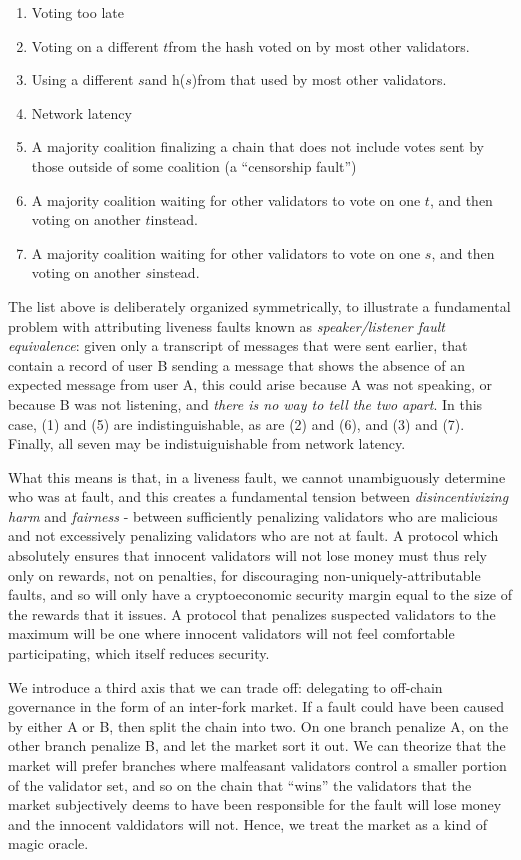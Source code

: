 \documentclass[12pt, final]{article}
\newcommand{\source}{\ensuremath{s}\space}
\newcommand{\target}{\ensuremath{t}\space}
\newcommand{\sourceheight}{\textnormal{h(\ensuremath{s})}\space} %
\begin{document}
\begin{enumerate}
\item Voting too late
\item Voting on a different \target from the hash voted on by most other validators.
\item Using a different \source and \sourceheight from that used by most other validators.
\item Network latency
\item A majority coalition finalizing a chain that does not include votes sent by those outside of some coalition (a ``censorship fault'')
\item A majority coalition waiting for other validators to vote on one \target, and then voting on another \target instead.
\item A majority coalition waiting for other validators to vote on one \source, and then voting on another \source instead.
\end{enumerate}

The list above is deliberately organized symmetrically, to illustrate a fundamental problem with attributing liveness faults known as \textit{speaker/listener fault equivalence}: given only a transcript of messages that were sent earlier, that contain a record of user B sending a message that shows the absence of an expected message from user A, this could arise because A was not speaking, or because B was not listening, and \textit{there is no way to tell the two apart}. In this case, (1) and (5) are indistinguishable, as are (2) and (6), and (3) and (7). Finally, all seven may be indistuiguishable from network latency.

What this means is that, in a liveness fault, we cannot unambiguously determine who was at fault, and this creates a fundamental tension between \textit{disincentivizing harm} and \textit{fairness} - between sufficiently penalizing validators who are malicious and not excessively penalizing validators who are not at fault. A protocol which absolutely ensures that innocent validators will not lose money must thus rely only on rewards, not on penalties, for discouraging non-uniquely-attributable faults, and so will only have a cryptoeconomic security margin equal to the size of the rewards that it issues. A protocol that penalizes suspected validators to the maximum will be one where innocent validators will not feel comfortable participating, which itself reduces security.

We introduce a third axis that we can trade off: delegating to off-chain governance in the form of an inter-fork market. If a fault could have been caused by either A or B, then split the chain into two. On one branch penalize A, on the other branch penalize B, and let the market sort it out. We can theorize that the market will prefer branches where malfeasant validators control a smaller portion of the validator set, and so on the chain that ``wins'' the validators that the market subjectively deems to have been responsible for the fault will lose money and the innocent valdidators will not. Hence, we treat the market as a kind of magic oracle.
\end{document}

